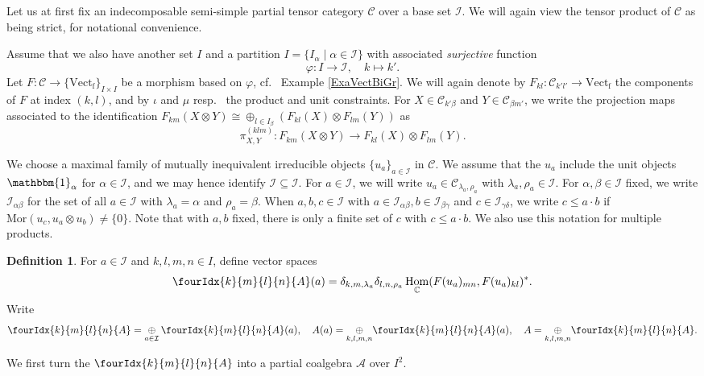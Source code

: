 \documentclass[10pt]{article}
\DeclareMathOperator{\fin}{\mathrm{f}}
\DeclareMathOperator{\Hom}{Hom}
\newcommand{\C}{\mathbb{C}}
\newcommand{\CatC}{\mathcal{C}}
\newcommand{\CatCC}{\mathscr{C}}
\newcommand{\Mor}{\mathrm{Mor}}
\newcommand{\Vect}{\mathrm{Vect}}
\newcommand{\Unitb}{\mathbbm{1}}
\newcommand{\Gr}[5]{\fourIdx{#2}{#4}{#3}{#5}{#1}}%
\theoremstyle{definition}
\newtheorem{Def}[Theorem]{Definition}
\numberwithin{equation}{section}
\begin{document}
Let us at first fix an indecomposable semi-simple partial tensor category $\CatCC$ over a base set $\mathscr{I}$. We will again view the tensor product of $\CatC$ as being strict, for notational convenience. 

Assume that we also have another set $I$ and a partition $I = \{I_\alpha\mid \alpha\in \mathscr{I}\}$ with associated \emph{surjective} function \[\varphi:I\rightarrow \mathscr{I}, \quad k\mapsto k'.\] Let $F: \CatCC\rightarrow \{\Vect_{\fin}\}_{I\times I}$ be a morphism based on $\varphi$, cf.~ Example \ref{ExaVectBiGr}.  We will again denote by $F_{kl}:\CatCC_{k'l'}\rightarrow \Vect_{\fin}$ the components of $F$ at index $(k,l)$, and by $\iota$ and $\mu$ resp.~ the product and unit constraints.  For $X\in \CatC_{k'\beta}$ and $Y\in \CatC_{\beta m'}$, we write the projection maps associated to the identification $F_{km}(X\otimes Y)\cong \oplus_{l\in I_\beta} \left(F_{kl}(X)\otimes F_{lm}(Y)\right)$ as \[\pi^{(klm)}_{X,Y}:F_{km}(X\otimes Y) \rightarrow F_{kl}(X)\otimes F_{lm}(Y).\]

We choose a maximal family of mutually inequivalent irreducible objects $\{u_a\}_{a\in \mathcal{I}}$ in $\CatC$. We assume that the $u_a$ include the unit objects $\Unitb_{\alpha}$ for $\alpha\in \mathscr{I}$, and we may hence identify $\mathscr{I}\subseteq \mathcal{I}$. For $a\in \mathcal{I}$, we will write $u_a \in \CatC_{\lambda_a,\rho_a}$ with $\lambda_a,\rho_a\in \mathscr{I}$. For $\alpha,\beta\in \mathscr{I}$ fixed, we write $\mathcal{I}_{\alpha\beta}$ for the set of all $a\in \mathcal{I}$ with $\lambda_a=\alpha$ and $\rho_a=\beta$. When $a,b,c\in \mathcal{I}$ with $a\in \mathcal{I}_{\alpha\beta},b\in \mathcal{I}_{\beta\gamma}$ and $c\in \mathcal{I}_{\gamma\delta}$, we write $c\leq a\cdot b$ if $\Mor(u_c,u_a\otimes u_b)\neq \{0\}$. Note that with $a,b$ fixed, there is only a finite set of $c$ with $c\leq a\cdot b$. We also use this notation for multiple products.

\begin{Def} For $a\in \mathcal{I}$ and $k,l,m,n\in I$, define vector spaces \[\Gr{A}{k}{l}{m}{n}(a) =  \delta_{k,m,\lambda_a}\delta_{l,n,\rho_a} \Hom_{\C}(F(u_a)_{mn},F(u_a)_{kl})^*.\] Write \[\Gr{A}{k}{l}{m}{n} =\underset{a\in \mathcal{I}}{\oplus}\, \Gr{A}{k}{l}{m}{n}(a),\quad A(a) = \underset{k,l,m,n}{\oplus} \Gr{A}{k}{l}{m}{n}(a),\quad A = \underset{k,l,m,n}{\oplus} \Gr{A}{k}{l}{m}{n}.\] 
\end{Def} 

We first turn the $\Gr{A}{k}{l}{m}{n}$ into a partial coalgebra $\mathscr{A}$ over $I^2$.
\end{document}

